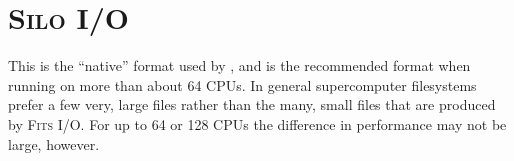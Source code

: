 \documentclass[a4paper,11pt]{report}
\begin{document}
\section{\textsc{Silo} I/O}
This is the ``native'' format used by \pion{}, and is the recommended format when running on more than about 64 CPUs.
In general supercomputer filesystems prefer a few very, large files rather than the many, small files that are produced by \textsc{Fits} I/O.
For up to 64 or 128 CPUs the difference in performance may not be large, however.





\end{document}
